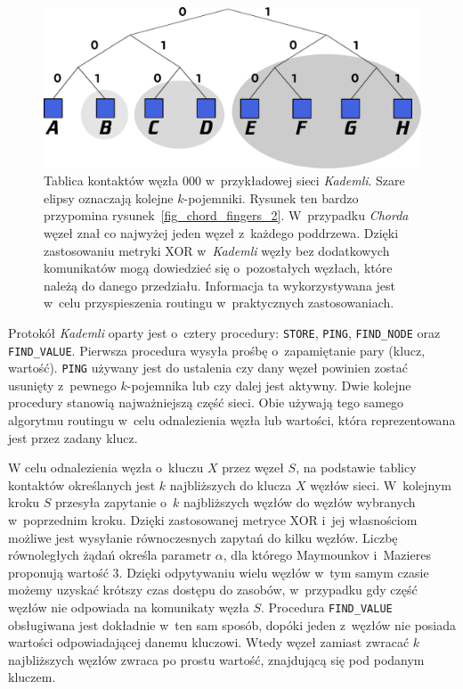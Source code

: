 \documentclass[a4paper,11pt]{scrartcl}
\newcommand{\f}{\texttt}
\begin{document}
\begin{figure}[h]
\centering
\includegraphics[width=0.9\linewidth]{img/kademlia.pdf}
\caption{Tablica kontaktów węzła $000$ w~przykładowej sieci \textit{Kademli}. Szare elipsy oznaczają kolejne $k$-pojemniki. Rysunek ten bardzo przypomina rysunek~\ref{fig_chord_fingers_2}. W~przypadku \textit{Chorda} węzeł znał co najwyżej jeden węzeł z~każdego poddrzewa. Dzięki zastosowaniu metryki XOR w~\textit{Kademli} węzły bez dodatkowych komunikatów mogą dowiedzieć się o~pozostałych węzłach, które należą do danego przedziału. Informacja ta wykorzystywana jest w~celu przyspieszenia routingu w~praktycznych zastosowaniach.}
\label{fig_kademlia}
\end{figure}

\label{kad_routing}
Protokół \textit{Kademli} oparty jest o~cztery procedury: \f{STORE}, \f{PING}, \f{FIND\_NODE} oraz \f{FIND\_VALUE}. Pierwsza procedura wysyła prośbę o~zapamiętanie pary (klucz, wartość). \f{PING} używany jest do ustalenia czy dany węzeł powinien zostać usunięty z~pewnego $k$-pojemnika lub czy dalej jest aktywny. Dwie kolejne procedury stanowią najważniejszą część sieci. Obie używają tego samego algorytmu routingu w~celu odnalezienia węzła lub wartości, która reprezentowana jest przez zadany klucz.

W celu odnalezienia węzła o~kluczu $X$ przez węzeł $S$, na podstawie tablicy kontaktów określanych jest $k$ najbliższych do klucza $X$ węzłów sieci. W~kolejnym kroku $S$ przesyła zapytanie o~$k$ najbliższych węzłów do węzłów wybranych w~poprzednim kroku. Dzięki zastosowanej metryce XOR i~jej własnościom możliwe jest wysyłanie równoczesnych zapytań do kilku węzłów. Liczbę równoległych żądań określa parametr $\alpha$, dla którego Maymounkov i~Mazieres proponują wartość 3. Dzięki odpytywaniu wielu węzłów w~tym samym czasie możemy uzyskać krótszy czas dostępu do zasobów, w~przypadku gdy część węzłów nie odpowiada na komunikaty węzła $S$. Procedura \f{FIND\_VALUE} obsługiwana jest dokładnie w~ten sam sposób, dopóki jeden z~węzłów nie posiada wartości odpowiadającej danemu kluczowi. Wtedy węzeł zamiast zwracać $k$ najbliższych węzłów zwraca po prostu wartość, znajdującą się pod podanym kluczem.
\end{document}
